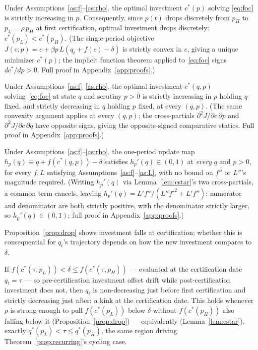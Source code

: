 \begin{proposition}
Under Assumptions~\ref{as:f}--\ref{as:rho}, the optimal investment $c^*(p)$ solving \eqref{eq:foc} is strictly increasing in $p$. Consequently, since $p(t)$ drops discretely from $p_H$ to $p_L = \rho\, p_H$ at first certification, optimal investment drops discretely: $c^*(p_L) < c^*(p_H)$. (The single-period objective $J(c;p)=c+\beta p\,L(q_t+f(c)-\delta)$ is strictly convex in $c$, giving a unique minimizer $c^*(p)$; the implicit function theorem applied to~\eqref{eq:foc} signs $dc^*/dp>0$. Full proof in Appendix~\ref{app:proofs}.)
\label{prop:drop}
\end{proposition}

\begin{lemma}
\label{lem:cstar}
Under Assumptions~\ref{as:f}--\ref{as:rho}, the optimal investment $c^*(q,p)$ solving~\eqref{eq:foc} at state $q$ and scrutiny $p>0$ is strictly increasing in $p$ holding $q$ fixed, and strictly decreasing in $q$ holding $p$ fixed, at every $(q,p)$. (The same convexity argument applies at every $(q,p)$; the cross-partials $\partial^2J/\partial c\,\partial p$ and $\partial^2J/\partial c\,\partial q$ have opposite signs, giving the opposite-signed comparative statics. Full proof in Appendix~\ref{app:proofs}.)
\end{lemma}

\begin{corollary}
\label{cor:slopebound}
Under Assumptions~\ref{as:f}--\ref{as:rho}, the one-period update map $h_p(q) \equiv q + f(c^*(q,p)) - \delta$ satisfies $h_p'(q) \in (0,1)$ at \emph{every} $q$ and $p>0$, for every $f,L$ satisfying Assumptions~\ref{as:f}--\ref{as:L}, with no bound on $f''$ or $L''$'s magnitude required. (Writing $h_p'(q)$ via Lemma~\ref{lem:cstar}'s two cross-partials, a common term cancels, leaving $h_p'(q)=L'f''/(L''f'^2+L'f'')$: numerator and denominator are both strictly positive, with the denominator strictly larger, so $h_p'(q)\in(0,1)$; full proof in Appendix~\ref{app:proofs}.)
\end{corollary}

Proposition~\ref{prop:drop} shows investment falls at certification; whether this is consequential for $q_t$'s trajectory depends on how the new investment compares to $\delta$.

\begin{corollary}
If $f(c^*(\tau,p_L)) < \delta \leq f(c^*(\tau,p_H))$ — evaluated at the certification date $q_t=\tau$ — so pre-certification investment offset drift while post-certification investment does not, then $q_t$ is non-decreasing just before first certification and strictly decreasing just after: a kink at the certification date. This holds whenever $\rho$ is strong enough to pull $f(c^*(p_L))$ below $\delta$ without $f(c^*(p_H))$ also falling below it (Proposition~\ref{prop:drop}) — equivalently (Lemma~\ref{lem:cstar}), exactly $q^*(p_L) < \tau \leq q^*(p_H)$, the same region driving Theorem~\ref{prop:recurring}'s cycling case.
\label{cor:kink}
\end{corollary}


